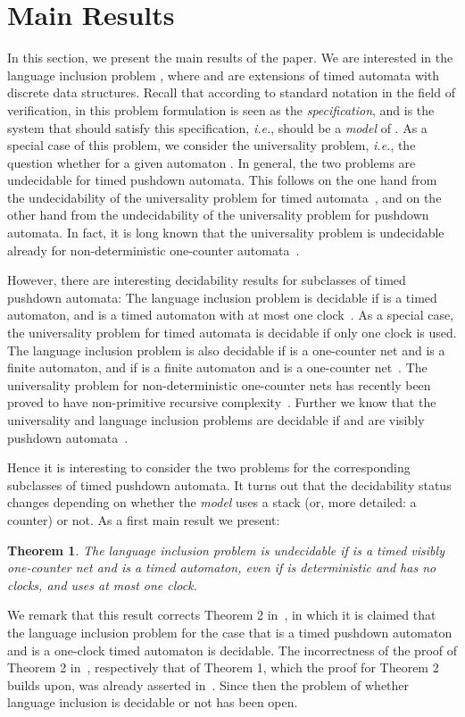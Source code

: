\documentclass{CSML}
\theoremstyle{plain}\newtheorem{theorem}[thm]{Theorem}
\theoremstyle{plain}\newtheorem{corollary}[thm]{Corollary}
\theoremstyle{plain}\newtheorem{example}[thm]{Example}
\theoremstyle{plain}\newtheorem{lemma}[thm]{Lemma}
\theoremstyle{plain}\newtheorem{remark}[thm]{Remark}
\newcommand*\ie{\textit{i.e.}}
\begin{document}
\section{Main Results}
In this section,
we present the main results of the paper.
We are interested in the language inclusion problem , where
 and  are extensions of timed automata with discrete data structures.
Recall that according to standard notation in the field of verification, in this problem formulation 
 is seen as the \emph{specification}, and  is the system that should satisfy this specification, \ie,  should be a \emph{model} of .  
	As a special case of this problem, we consider the universality problem, \ie, the question whether  for a given automaton .	
	In general, the two problems are undecidable  for timed pushdown automata. 
	This follows on the one hand  from the undecidability of the universality problem for timed automata~\cite{AD94}, 
	and on the other hand from the undecidability of the universality problem for pushdown automata. In fact, it is long known that the universality problem is  undecidable already for non-deterministic one-counter automata~\cite{DBLP:journals/jacm/Greibach69,DBLP:journals/mst/Ibarra79}.
	
		
	However, there are interesting decidability results for subclasses of timed pushdown automata:
	The language inclusion problem is decidable if  is a timed automaton, and  is a timed automaton with at most one clock~\cite{DBLP:conf/lics/OuaknineW04}. As a special case, the universality problem for timed automata is decidable if only one clock is used. 
	The language inclusion problem is also decidable if
	 is a one-counter net and  is a finite automaton, 
	and if  is a finite automaton and  is a one-counter net~\cite{DBLP:journals/jcss/JanarEM99}.
	The universality problem for non-deterministic one-counter nets has recently been proved to have non-primitive recursive complexity~\cite{DBLP:conf/rp/HofmanT14}.
Further we know that the universality and language inclusion problems are decidable if  and  are visibly pushdown automata~\cite{DBLP:conf/stoc/AlurM04}.
	

	Hence it is interesting to consider the two problems for the corresponding subclasses of timed pushdown automata.
	It turns out that the decidability status changes depending on whether the \emph{model} uses a stack (or, more detailed: a counter) or not.
	As a first main result we present:
	\begin{theorem}
		\label{theorem_main_lang_inc}
		The language inclusion problem is undecidable if  is a timed visibly one-counter net and  is a timed automaton, even if  is deterministic and has no clocks, and  uses at most one clock. 
	\end{theorem}
	We remark that this result corrects Theorem 2 in~\cite{EmmiM06}, in which it is claimed that the language inclusion problem for the case that  is a timed pushdown automaton and  is a one-clock timed automaton is decidable.
	The incorrectness of the proof of Theorem 2 in~\cite{EmmiM06}, respectively that of Theorem 1, which the proof for Theorem 2 builds upon,  was already asserted in~\cite{DBLP:conf/concur/ChadhaV07}. Since then the problem of whether language inclusion is decidable or not has been open. 
	
\end{document}
